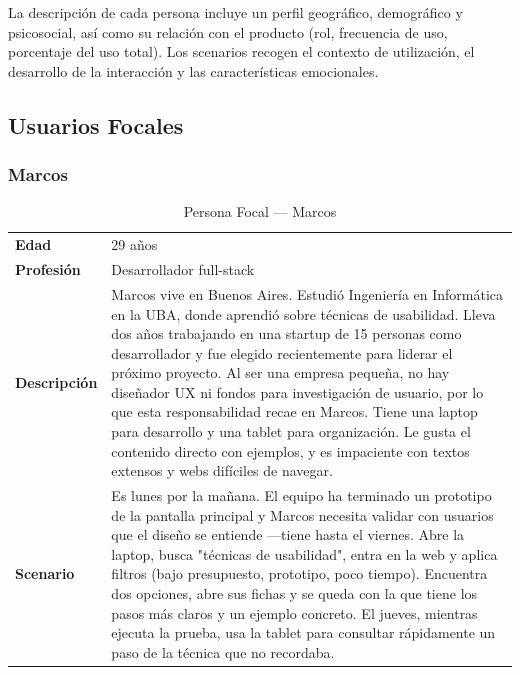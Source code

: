 \documentclass[12pt, a4paper]{report}
\begin{document}
La descripción de cada persona incluye un perfil geográfico, demográfico y psicosocial, así
como su relación con el producto (rol, frecuencia de uso, porcentaje del uso total). Los
scenarios recogen el contexto de utilización, el desarrollo de la interacción y las
características emocionales.

\subsection{Usuarios Focales}

\subsubsection{Marcos}

\begin{table}[H]
\centering
\begin{tabularx}{\linewidth}{lX}
\toprule
\textbf{Edad} & 29 años \\
\textbf{Profesión} & Desarrollador full-stack \\
\midrule
\textbf{Descripción} &
Marcos vive en Buenos Aires. Estudió Ingeniería en Informática en la UBA, donde aprendió
sobre técnicas de usabilidad. Lleva dos años trabajando en una startup de 15 personas como
desarrollador y fue elegido recientemente para liderar el próximo proyecto. Al ser una empresa
pequeña, no hay diseñador UX ni fondos para investigación de usuario, por lo que esta
responsabilidad recae en Marcos. Tiene una laptop para desarrollo y una tablet para organización.
Le gusta el contenido directo con ejemplos, y es impaciente con textos extensos y webs difíciles
de navegar. \\[4pt]
\textbf{Scenario} &
Es lunes por la mañana. El equipo ha terminado un prototipo de la pantalla principal y Marcos
necesita validar con usuarios que el diseño se entiende —tiene hasta el viernes. Abre la laptop,
busca "técnicas de usabilidad", entra en la web y aplica filtros (bajo presupuesto, prototipo, poco
tiempo). Encuentra dos opciones, abre sus fichas y se queda con la que tiene los pasos más claros
y un ejemplo concreto. El jueves, mientras ejecuta la prueba, usa la tablet para consultar
rápidamente un paso de la técnica que no recordaba. \\
\bottomrule
\end{tabularx}
\caption{Persona Focal — Marcos}
\end{table}
\end{document}
